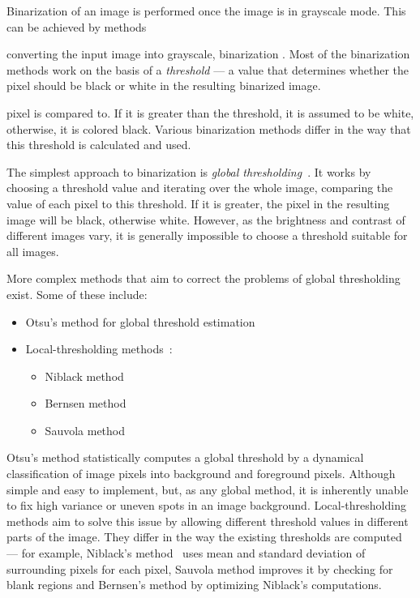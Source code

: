 Binarization of an image is performed once the image is in grayscale mode. This can be achieved by methods 

 converting the input image into grayscale, binarization . Most of the binarization methods work on the basis of a \emph{threshold} --- a value that determines whether the pixel should be black or white in the resulting binarized image.


pixel is compared to. If it is greater than the threshold, it is assumed to be white, otherwise, it is colored black. Various binarization methods differ in the way that this threshold is calculated and used.

The simplest approach to binarization is \emph{global thresholding}~\citep{globalThresh}. It works by choosing a threshold value and iterating over the whole image, comparing the value of each pixel to this threshold. If it is greater, the pixel in the resulting image will be black, otherwise white. However, as the brightness and contrast of different images vary, it is generally impossible to choose a threshold suitable for all images.

More complex methods that aim to correct the problems of global thresholding exist. Some of these include:
\begin{itemize}
\item Otsu's method for global threshold estimation~\citep{otsu}
\item Local-thresholding methods~\citep{localOtherBin}:
\begin{itemize}
\item Niblack method
\item Bernsen method
\item Sauvola method
\end{itemize}
\end{itemize}

Otsu's method statistically computes a global threshold by a dynamical classification of image pixels into background and foreground pixels. Although simple and easy to implement, but, as any global method, it is inherently unable to fix high variance or uneven spots in an image background. Local-thresholding methods aim to solve this issue by allowing different threshold values in different parts of the image. They differ in the way the existing thresholds are computed --- for example, Niblack's method~\citep{adaptiveBin} uses mean and standard deviation of surrounding pixels for each pixel, Sauvola method improves it by checking for blank regions and Bernsen's method by optimizing Niblack's computations. 

